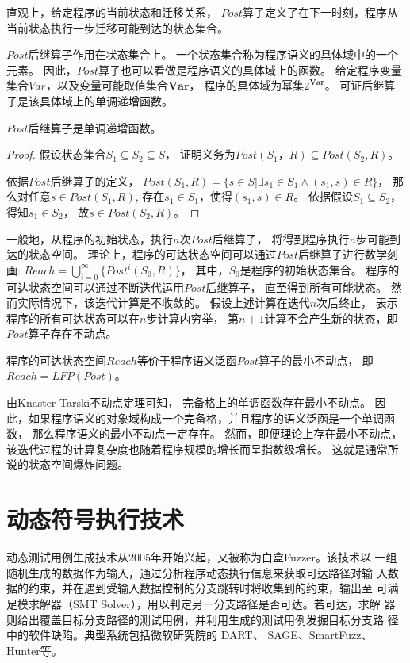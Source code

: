 直观上，给定程序的当前状态和迁移关系，
$Post$算子定义了在下一时刻，程序从当前状态执行一步迁移可能到达的状态集合。

$Post$后继算子作用在状态集合上。
一个状态集合称为程序语义的具体域中的一个元素。
因此，$Post$算子也可以看做是程序语义的具体域上的函数。
给定程序变量集合$Var$，以及变量可能取值集合$\textbf{Var}$，
程序的具体域为幂集$2^{\textbf{Var}}$。
可证后继算子是该具体域上的单调递增函数。

\begin{lemma}
$Post$后继算子是单调递增函数。
\end{lemma}

\begin{proof}
	假设状态集合$S_1 \subseteq S_2 \subseteq S$，
	证明义务为$Post(S_1， R) \subseteq Post(S_2,R)$。
	
	依据$Post$后继算子的定义，
	$Post(S_1, R) = \{ s\in S | \exists s_1 \in S_1 \wedge (s_1, s)\in R \}$，
	那么对任意$s\in Post(S_1, R)$,
	存在$s_1\in S_1$，使得$(s_1, s)\in R$。
	依据假设$S_1 \subseteq S_2$，得知$s_1 \in S_2$，
	故$s\in Post(S_2, R)$。
\end{proof}


一般地，从程序的初始状态，执行$n$次$Post$后继算子，
将得到程序执行$n$步可能到达的状态空间。
理论上，程序的可达状态空间可以通过$Post$后继算子进行数学刻画:
$Reach = \bigcup_{i=0}^{\infty}\{Post^{i}(S_0, R)\}$，
其中，$S_0$是程序的初始状态集合。
程序的可达状态空间可以通过不断迭代运用$Post$后继算子，
直至得到所有可能状态。
然而实际情况下，该迭代计算是不收敛的。
假设上述计算在迭代$n$次后终止，
表示程序的所有可达状态可以在$n$步计算内穷举，
第$n+1$计算不会产生新的状态，即$Post$算子存在不动点。


\begin{lemma}
程序的可达状态空间$Reach$等价于程序语义泛函$Post$算子的最小不动点，
即$Reach = LFP(Post)$。
\end{lemma}

由Knaster-Tarski不动点定理可知，	完备格上的单调函数存在最小不动点。
因此，如果程序语义的对象域构成一个完备格，并且程序的语义泛函是一个单调函数，
那么程序语义的最小不动点一定存在。
然而，即便理论上存在最小不动点，
该迭代过程的计算复杂度也随着程序规模的增长而呈指数级增长。
这就是通常所说的状态空间爆炸问题。

\section{动态符号执行技术}
动态测试用例生成技术从2005年开始兴起，又被称为白盒Fuzzer。该技术以
一组随机生成的数据作为输入，通过分析程序动态执行信息来获取可达路径对输
入数据的约束，并在遇到受输入数据控制的分支跳转时将收集到的约束，输出至
可满足模求解器（SMT Solver），用以判定另一分支路径是否可达。若可达，求解
器则给出覆盖目标分支路径的测试用例，并利用生成的测试用例发掘目标分支路
径中的软件缺陷。典型系统包括微软研究院的 DART、 SAGE、SmartFuzz、 Hunter等。

